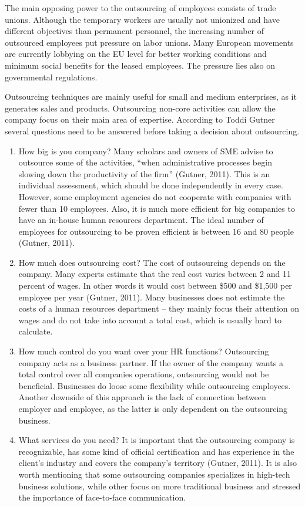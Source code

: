 \documentclass[a4paper,fleqn,11pt,dvips,titlepage]{article}
\numberwithin{figure}{section}
\numberwithin{equation}{section}
\begin{document}
The main opposing power to the outsourcing of employees consists of trade unions.
Although the temporary workers are usually not unionized and have different objectives than permanent personnel,
the increasing number of outsourced employees put pressure on labor unions.
Many European movements are currently lobbying on the EU level for better working conditions and minimum social benefits for the leased employees.
The pressure lies also on governmental regulations. 

Outsourcing techniques are mainly useful for small and medium enterprises, as it generates sales and products.
Outsourcing non-core activities can allow the company focus on their main area of expertise.
According to Toddi Gutner several questions need to be answered before taking a decision about outsourcing.

\begin{enumerate}
  \item How big is you company? Many scholars and owners of SME advise to outsource some of the activities, “when administrative processes begin slowing down the productivity of the firm” (Gutner, 2011). This is an individual assessment, which should be done independently in every case. However, some employment agencies do not cooperate with companies with fewer than 10 employees. Also, it is much more efficient for big companies to have an in-house human resources department. The ideal number of employees for outsourcing to be proven efficient is between 16 and 80 people (Gutner, 2011).
  \item How much does outsourcing cost? The cost of outsourcing depends on the company. Many experts estimate that the real cost varies between 2 and 11 percent of wages. In other words it would cost between \$500 and \$1,500 per employee per year (Gutner, 2011). Many businesses does not estimate the costs of a human resources department – they mainly focus their attention on wages and do not take into account a total cost, which is usually hard to calculate.
  \item How much control do you want over your HR functions? Outsourcing company acts as a business partner. If the owner of the company wants a total control over all companies operations, outsourcing would not be beneficial. Businesses do loose some flexibility while outsourcing employees. Another downside of this approach is the lack of connection between employer and employee, as the latter is only dependent on the outsourcing business.
  \item What services do you need? It is important that the outsourcing company is recognizable, has some kind of official certification and has experience in the client’s industry and covers the company’s territory (Gutner, 2011). It is also worth mentioning that some outsourcing companies specializes in high-tech business solutions, while other focus on more traditional business and stressed the importance of face-to-face communication. 
\end{enumerate}
\end{document}
